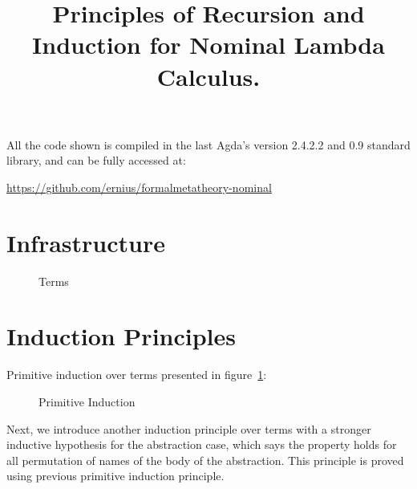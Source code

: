 \documentclass{article}
\title{Principles of Recursion and Induction for Nominal Lambda Calculus.}
\begin{document}
\maketitle

All the code shown is compiled in the last Agda's version 2.4.2.2 and 0.9 standard library, and can be fully accessed at:

\begin{center}
  \href{https://github.com/ernius/formalmetatheory-nominal}{https://github.com/ernius/formalmetatheory-nominal}
\end{center}

\section{Infrastructure}
\label{sec:infra}

\begin{figure}[!ht]
   \hspace{5px}
  \caption{Terms}
\label{fig:term}
\end{figure}

 \hspace{5px}

 \hspace{5px}

 \hspace{5px}

 \hspace{5px}

 \hspace{5px}



\section{Induction Principles}
\label{sec:induction}

Primitive induction over terms presented in figure~\ref{fig:term}:

\begin{figure}[!ht]
  \caption{Primitive Induction}
\label{fig:primInd}
\end{figure}

Next, we introduce another induction principle over terms with a stronger inductive hypothesis for the abstraction case, which says the property holds for all permutation of names of the body of the abstraction. This principle is proved using previous primitive induction principle.
\end{document}
